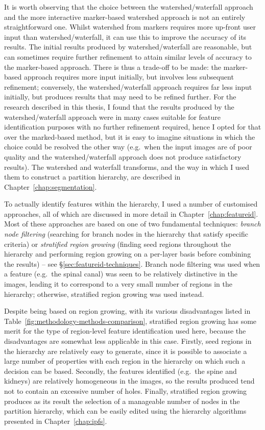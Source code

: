 %
It is worth observing that the choice between the watershed/waterfall approach and the more interactive marker-based watershed approach is not an entirely straightforward one. Whilst watershed from markers requires more up-front user input than watershed/waterfall, it can use this to improve the accuracy of its results. The initial results produced by watershed/waterfall are reasonable, but can sometimes require further refinement to attain similar levels of accuracy to the marker-based approach. There is thus a trade-off to be made: the marker-based approach requires more input initially, but involves less subsequent refinement; conversely, the watershed/waterfall approach requires far less input initially, but produces results that may need to be refined further. For the research described in this thesis, I found that the results produced by the watershed/waterfall approach were in many cases suitable for feature identification purposes with no further refinement required, hence I opted for that over the marked-based method, but it is easy to imagine situations in which the choice could be resolved the other way (e.g.~when the input images are of poor quality and the watershed/waterfall approach does not produce satisfactory results). The watershed and waterfall transforms, and the way in which I used them to construct a partition hierarchy, are described in Chapter~\ref{chap:segmentation}.

To actually identify features within the hierarchy, I used a number of customised approaches, all of which are discussed in more detail in Chapter~\ref{chap:featureid}. Most of these approaches are based on one of two fundamental techniques: \emph{branch node filtering} (searching for branch nodes in the hierarchy that satisfy specific criteria) or \emph{stratified region growing} (finding seed regions throughout the hierarchy and performing region growing on a per-layer basis before combining the results) -- see \S\ref{sec:featureid-techniques}. Branch node filtering was used when a feature (e.g.~the spinal canal) was seen to be relatively distinctive in the images, leading it to correspond to a very small number of regions in the hierarchy; otherwise, stratified region growing was used instead.

Despite being based on region growing, with its various disadvantages listed in Table~\ref{fig:methodology-methods-comparison}, stratified region growing has some merit for the type of region-level feature identification used here, because the disadvantages are somewhat less applicable in this case. Firstly, seed regions in the hierarchy are relatively easy to generate, since it is possible to associate a large number of properties with each region in the hierarchy on which such a decision can be based. Secondly, the features identified (e.g.~the spine and kidneys) are relatively homogeneous in the images, so the results produced tend not to contain an excessive number of holes. Finally, stratified region growing produces as its result the selection of a manageable number of nodes in the partition hierarchy, which can be easily edited using the hierarchy algorithms presented in Chapter~\ref{chap:ipfs}.

